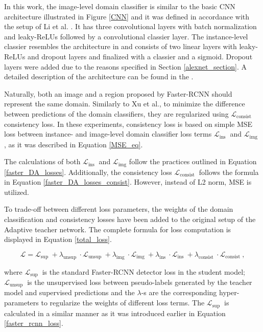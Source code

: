 \documentclass[english, 12pt, a4paper, elec, utf8, a-1b, online]{aaltothesis}
\begin{document}
In this work, the image-level domain classifier is similar to the basic CNN architecture illustrated in Figure \ref{CNN} and it was defined in accordance with the setup of Li et al. \cite{Li2021}. It has three convolutional layers with batch normalization and leaky-ReLUs followed by a convolutional classier layer. The instance-level classier resembles the architecture in \cite{Xu2020} and consists of two linear layers with leaky-ReLUs and dropout layers and finalized with a classier and a sigmoid. Dropout layers were added due to the reasons specified in Section \ref{alexnet_section}. A detailed description of the architecture can be found in the . 

Naturally, both an image and a region proposed by Faster-RCNN should represent the same domain. Similarly to Xu et al., to minimize the difference between predictions of the domain classifiers, they are regularized using $\mathcal{L}_{\text {consist }}$ consistency loss. In these experiments, consistency loss is based on simple MSE loss between instance- and image-level domain classifier loss terms $\mathcal{L}_{\text {ins }}$ and $\mathcal{L}_{\text {img }}$, as it was described in Equation \ref{MSE_eq}.

The calculations of both $\mathcal{L}_{\text {ins }}$ and $\mathcal{L}_{\text {img}}$ follow the practices outlined in Equation \ref{faster_DA_losses}. Additionally,  the consistency loss $\mathcal{L}_{\text {consist }}$ follows the formula in Equation \ref{faster_DA_losses_consist}. However, instead of L2 norm, MSE is utilized.  

To trade-off between different loss parameters, the weights of the domain classification and consistency losses have been added to the original setup of the Adaptive teacher network. The complete formula for loss computation is displayed in Equation \ref{total_loss}. 

\begin{equation}
\mathcal{L}=\mathcal{L}_{\text {sup }}+\lambda_{\text {unsup }} \cdot \mathcal{L}_{\text {unsup }}+\lambda_{\text {img }} \cdot \mathcal{L}_{\text {img }}+\lambda_{\text {ins }} \cdot \mathcal{L}_{\text {ins }}+\lambda_{\text {consist }} \cdot \mathcal{L}_{\text {consist }},
\label{total_loss} 
\end{equation}

where $\mathcal{L}_{\text {sup }}$ is the standard Faster-RCNN detector loss in the student model; $\mathcal{L}_{\text {unsup }}$ is the unsupervised loss between pseudo-labels generated by the teacher model and supervised predictions and the $\lambda$-s are the corresponding hyper-parameters to regularize the weights of different loss terms. The $\mathcal{L}_{\text {sup }}$ is calculated in a similar manner as it was introduced earlier in Equation \ref{faster_rcnn_loss}. 
 
\end{document}
